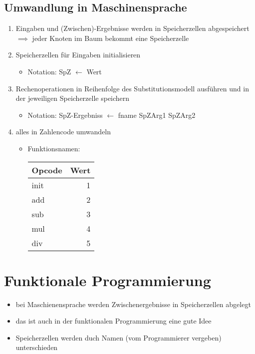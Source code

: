 \documentclass[a4paper]{scrartcl}
\begin{document}
\subsection{Umwandlung in Maschinensprache}
\label{sec-5-1}
\begin{enumerate}
\item Eingaben und (Zwischen)-Ergebnisse werden in Speicherzellen abgespeichert $\implies$ jeder Knoten im Baum bekommt eine Speicherzelle
\item Speicherzellen für Eingaben initialisieren
\begin{itemize}
\item Notation: SpZ $\leftarrow$ Wert
\end{itemize}
\item Rechenoperationen in Reihenfolge des Substitutionsmodell ausführen und in der jeweiligen Speicherzelle speichern
\begin{itemize}
\item Notation: SpZ-Ergebniss $\leftarrow$ fname SpZArg1 SpZArg2
\end{itemize}
\item alles in Zahlencode umwandeln
\begin{itemize}
\item Funktionsnamen:
\begin{center}
\begin{tabular}{lr}
Opcode & Wert\\
\hline
init & 1\\
add & 2\\
sub & 3\\
mul & 4\\
div & 5\\
\end{tabular}
\end{center}
\end{itemize}
\end{enumerate}
\section{Funktionale Programmierung}
\label{sec-6}
\begin{itemize}
\item bei Maschienensprache werden Zwischenergebnisse in Speicherzellen abgelegt
\item das ist auch in der funktionalen Programmierung eine gute Idee
\item Speicherzellen werden duch Namen (vom Programmierer vergeben) unterschieden
\end{itemize}
\end{document}
